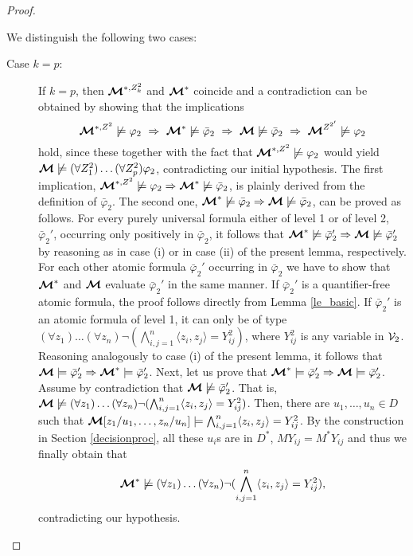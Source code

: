 \documentclass{fundam}
\newcommand{\model}{\ensuremath{\mbox{\boldmath $\mathcal{M}$}}\xspace}
\begin{document}
\begin{proof}
\begin{itemize}
We distinguish the following two cases:

\begin{description}
    \item[Case $k = p$:]
If $k = p$, then $\model^{*,Z_k^2}$ and $\model^*$ coincide and a
contradiction can be obtained by showing that the implications
\[
\model^{*,Z^2} \not\models \varphi_2 ~\Rightarrow~ \model^*\not\models
\bar{\varphi}_2 ~\Rightarrow~ \model \not\models \bar{\varphi}_2
~\Rightarrow~ \model^{Z^{2'}}\not\models \varphi_2
\]
hold, since these together with the fact that $\model^{*,Z^2}
\not\models \varphi_2$ would yield $\model \not\models (\forall
Z_1^2)\ldots(\forall Z_p^2)\varphi_2$, contradicting our initial
hypothesis.  The first implication,
$\model^{*,Z^2} \not\models \varphi_2 \Rightarrow \model^*\not\models
\bar{\varphi}_2$, is plainly derived from the definition of
$\bar{\varphi}_2$.  The second one, $\model^*\not\models
\bar{\varphi}_2 \Rightarrow \model \not\models \bar{\varphi}_2$, can
be proved as follows.  For every purely universal formula either of
level 1 or of level 2, $\bar{\varphi}_2'$, occurring only positively
in $\bar{\varphi}_2$, it follows that $\model^*\not\models
\bar{\varphi}_2' \Rightarrow \model \not\models \bar{\varphi}_2'$ by
reasoning as in case (i) or in case (ii) of the present lemma, respectively.  For
each other atomic formula $\bar{\varphi}_2'$ occurring in
$\bar{\varphi}_2$ we have to show that $\model^*$ and $\model$
evaluate $\bar{\varphi}_2'$ in the same manner.  If
$\bar{\varphi}_2'$ is a quantifier-free atomic formula, the proof
follows directly from Lemma \ref{le_basic}.  If $\bar{\varphi}_2'$ is
an atomic formula of level 1, it can only be of type $(\forall
z_1)\ldots(\forall z_n)\neg(\bigwedge_{i,j=1}^n \langle
z_i,z_j\rangle=Y_{ij}^2)$, where $Y_{ij}^2$ is any variable in
${\cal V}_2$.
Reasoning analogously to case (i) of the present lemma, it follows that $\model \models
\bar{\varphi}_2'\Rightarrow \model^* \models \bar{\varphi}_2'$.  Next,
let us prove that $\model^* \models \bar{\varphi}_2'\Rightarrow \model
\models \bar{\varphi}_2'$.  Assume by contradiction that $\model
\not\models \bar{\varphi}_2'$.  That is, $\model \not\models (\forall
z_1)\ldots(\forall z_n)\neg(\bigwedge_{i,j=1}^n\langle
z_i,z_j\rangle=Y_{ij}^2)$.  Then, there are $u_1,\ldots,u_n \in D$
such that $\model[z_1/u_1,\ldots,z_n/u_n]\models \bigwedge_{i,j=1}^n\langle z_i,z_j\rangle=Y_{ij}^2$.  By the
construction in Section \ref{decisionproc}, all these $u_i$s are in
$D^*$, $M Y_{ij} = M^* Y_{ij}$ and thus we finally obtain that
\[
\model^* \not\models (\forall z_1)\ldots(\forall
z_n)\neg(\bigwedge_{i,j=1}^n\langle
z_i,z_j\rangle=Y_{ij}^2),
\]
contradicting our hypothesis.


\end{description}
\end{itemize}
\end{proof}
\end{document}
